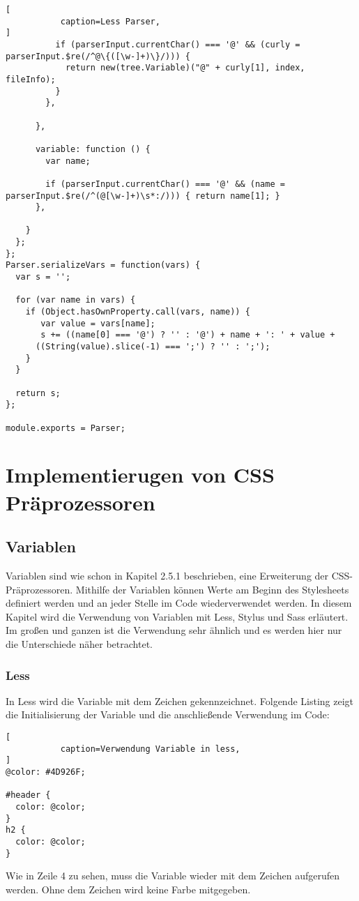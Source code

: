\begin{lstlisting}[
           caption=Less Parser,
]
          if (parserInput.currentChar() === '@' && (curly = parserInput.$re(/^@\{([\w-]+)\}/))) {
            return new(tree.Variable)("@" + curly[1], index, fileInfo);
          }
        },

      },

      variable: function () {
        var name;

        if (parserInput.currentChar() === '@' && (name = parserInput.$re(/^(@[\w-]+)\s*:/))) { return name[1]; }
      },

    }
  };
};
Parser.serializeVars = function(vars) {
  var s = '';

  for (var name in vars) {
    if (Object.hasOwnProperty.call(vars, name)) {
       var value = vars[name];
       s += ((name[0] === '@') ? '' : '@') + name + ': ' + value +
      ((String(value).slice(-1) === ';') ? '' : ';');
    }
  }

  return s;
};

module.exports = Parser;
\end{lstlisting}
\newpage


\section{Implementierugen von CSS Präprozessoren}
\subsection{Variablen}
Variablen sind wie schon in Kapitel 2.5.1 beschrieben, eine Erweiterung der CSS-Präprozessoren. Mithilfe der Variablen können Werte am Beginn des Stylesheets definiert werden und an jeder Stelle im Code wiederverwendet werden. In diesem Kapitel wird die Verwendung von Variablen mit Less, Stylus und Sass erläutert. Im großen und ganzen ist die Verwendung sehr ähnlich und es werden hier nur die Unterschiede näher betrachtet.
\subsubsection{Less}
In Less wird die Variable mit dem Zeichen \glqq{} gekennzeichnet. Folgende Listing zeigt die Initialisierung der Variable und die anschließende Verwendung im Code:
\begin{lstlisting}[
           caption=Verwendung Variable in less,
]
@color: #4D926F;

#header {
  color: @color;
}
h2 {
  color: @color;
}
\end{lstlisting}
Wie in Zeile 4 zu sehen, muss die Variable wieder mit dem \glqq{} Zeichen aufgerufen werden. Ohne dem  \glqq{} Zeichen wird keine Farbe mitgegeben.

